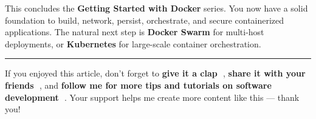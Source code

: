 \documentclass[11pt,american,a4paper,openany]{book}
\begin{document}
This concludes the \textbf{Getting Started with Docker} series. You now
have a solid foundation to build, network, persist, orchestrate, and
secure containerized applications. The natural next step is
\textbf{Docker Swarm} for multi-host deployments, or \textbf{Kubernetes}
for large-scale container orchestration.

\begin{center}\rule{0.5\linewidth}{0.5pt}\end{center}

If you enjoyed this article, don't forget to \textbf{give it a clap 👏},
\textbf{share it with your friends 🔗}, and \textbf{follow me for more
tips and tutorials on software development 📘}. Your support helps me
create more content like this --- thank you! 🙌
\end{document}
